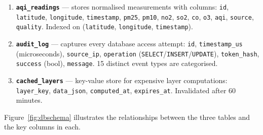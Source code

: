 \documentclass[12pt,a4paper]{article}
\begin{document}
\begin{enumerate}
\item \textbf{\texttt{aqi\_readings}} --- stores normalised measurements with
      columns: \texttt{id}, \texttt{latitude}, \texttt{longitude},
      \texttt{timestamp}, \texttt{pm25}, \texttt{pm10}, \texttt{no2},
      \texttt{so2}, \texttt{co}, \texttt{o3}, \texttt{aqi}, \texttt{source},
      \texttt{quality}. Indexed on (\texttt{latitude}, \texttt{longitude},
      \texttt{timestamp}).

\item \textbf{\texttt{audit\_log}} --- captures every database access attempt:
      \texttt{id}, \texttt{timestamp\_us} (microseconds), \texttt{source\_ip},
      \texttt{operation} (\texttt{SELECT}/\texttt{INSERT}/\texttt{UPDATE}),
      \texttt{token\_hash}, \texttt{success} (bool), \texttt{message}.
      15 distinct event types are categorised.

\item \textbf{\texttt{cached\_layers}} --- key-value store for expensive
      layer computations: \texttt{layer\_key}, \texttt{data\_json},
      \texttt{computed\_at}, \texttt{expires\_at}. Invalidated after 60 minutes.
\end{enumerate}

Figure~\ref{fig:dbschema} illustrates the relationships between the three
tables and the key columns in each.
\end{document}
